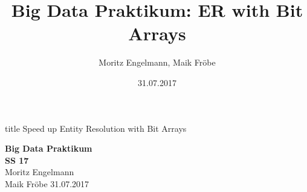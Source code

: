 \documentclass{beamer}
\title{Big Data Praktikum: ER with Bit Arrays}
\author{Moritz Engelmann, Maik Fröbe}
\date{31.07.2017}
\begin{document}
\begin{frame}
	\vfill
	\centering
	\begin{beamercolorbox}[sep=8pt,center,shadow=true,rounded=true]{title}
		Speed up Entity Resolution with Bit Arrays\\
		\par%
	\end{beamercolorbox}
	\vfill
	\textbf{Big Data Praktikum}\\
	\textbf{SS 17}\\
	\vfill
	Moritz Engelmann\\
	Maik Fröbe
	\vfill
	\hspace*{5.1cm}31.07.2017
\end{frame}

\begin{frame}
	\tableofcontents
\end{frame}








\end{document}

